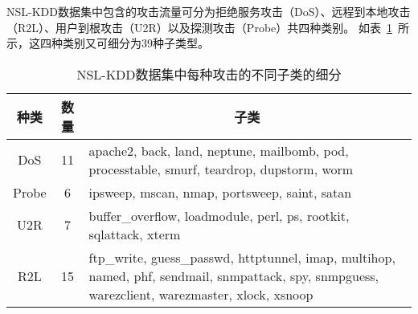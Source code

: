 NSL-KDD数据集中包含的攻击流量可分为拒绝服务攻击（DoS）、远程到本地攻击（R2L）、用户到根攻击（U2R）以及探测攻击（Probe）共四种类别。
如表~\ref{tab:attack_class}~所示，这四种类别又可细分为39种子类型。
\begin{table}[h]
	\caption{NSL-KDD数据集中每种攻击的不同子类的细分}
	\label{tab:attack_class}
	\begin{tabularx}{\textwidth}{@{}ccX@{}}
		\toprule
		\multicolumn{1}{c}{\textbf{种类}} & \multicolumn{1}{c}{\textbf{数量}} & \multicolumn{1}{c}{\textbf{子类}}                                                                                                                  \\
		\midrule
		DoS                             & 11                              & apache2, back, land, neptune, mailbomb, pod, processtable, smurf, teardrop, dupstorm, worm                                                       \\
		Probe                           & 6                               & ipsweep, mscan, nmap, portsweep, saint, satan                                                                                                    \\
		U2R                             & 7                               & buffer\_overflow, loadmodule, perl, ps, rootkit, sqlattack, xterm                                                                                \\
		R2L                             & 15                              & ftp\_write, guess\_passwd, httptunnel, imap, multihop, named, phf, sendmail, snmpattack, spy, snmpguess, warezclient, warezmaster, xlock, xsnoop \\
		\bottomrule
	\end{tabularx}
\end{table}

